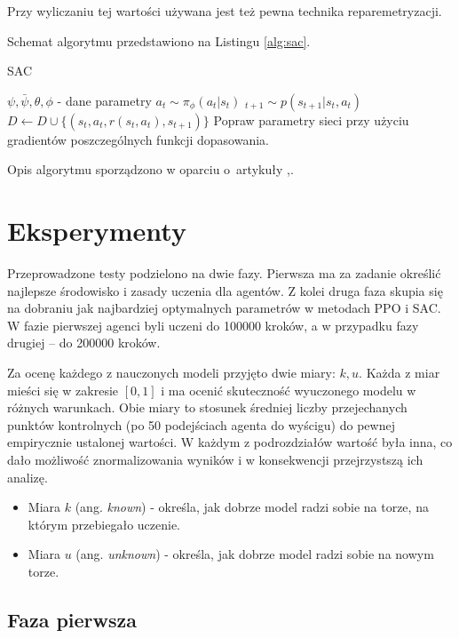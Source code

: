 \documentclass[a4paper,12pt]{article}
\let\oldsection\section
\renewcommand\section{\clearpage\oldsection}
\begin{document}
Przy wyliczaniu tej wartości używana jest też pewna technika reparemetryzacji.



Schemat algorytmu przedstawiono na Listingu \ref{alg:sac}.
\begin{algorithm}[h!]
	\caption{SAC}
	\label{alg:sac}
	\begin{algorithmic}[1]
		\STATE $\psi, \bar{\psi}, \theta,\phi$ - dane parametry
				\STATE $a_t \sim \pi_{\phi}(a_t|s_t)$
				\STATE $_{t+1} \sim p(s_{t+1}|s_t,a_t)$
				\STATE $D \gets D \cup \{(s_t,a_t,r(s_t,a_t),s_{t+1})\}$
			\ENDFOR
		\ENDFOR
		\STATE Popraw parametry sieci przy użyciu gradientów poszczególnych funkcji dopasowania.
	\end{algorithmic}
\end{algorithm}

Opis algorytmu sporządzono w oparciu o~artykuły \cite{kumar},\cite{nieznany}.

\section{Eksperymenty}
Przeprowadzone testy podzielono na dwie fazy. Pierwsza ma za zadanie określić najlepsze środowisko i zasady uczenia dla agentów. Z kolei druga faza skupia się na dobraniu jak najbardziej optymalnych parametrów w metodach PPO i SAC. W fazie pierwszej agenci byli uczeni do 100000 kroków, a w przypadku fazy drugiej -- do 200000 kroków.

Za ocenę każdego z nauczonych modeli przyjęto dwie miary: $k, u$. Każda z miar mieści się w zakresie $[0,1]$ i ma ocenić skuteczność wyuczonego modelu w różnych warunkach. Obie miary to stosunek średniej liczby przejechanych punktów kontrolnych (po 50 podejściach agenta do wyścigu) do pewnej empirycznie ustalonej wartości. W każdym z podrozdziałów wartość była inna, co dało możliwość znormalizowania wyników i w konsekwencji przejrzystszą ich analizę.
\begin{itemize}
	\item Miara $k$ (ang. \textit{known}) - określa, jak dobrze model radzi sobie na torze, na którym przebiegało uczenie.
	\item Miara $u$ (ang. \textit{unknown}) - określa, jak dobrze model radzi sobie na nowym torze. 
\end{itemize}


\subsection{Faza pierwsza}
\end{document}
